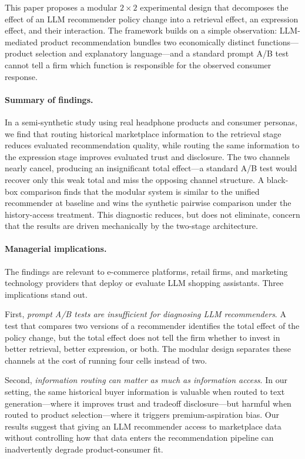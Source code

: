 \documentclass[11pt]{article}
\begin{document}
This paper proposes a modular $2 \times 2$ experimental design that decomposes the effect of an LLM recommender policy change into a retrieval effect, an expression effect, and their interaction. The framework builds on a simple observation: LLM-mediated product recommendation bundles two economically distinct functions---product selection and explanatory language---and a standard prompt A/B test cannot tell a firm which function is responsible for the observed consumer response.

\paragraph{Summary of findings.}
In a semi-synthetic study using real headphone products and consumer personas, we find that routing historical marketplace information to the retrieval stage reduces evaluated recommendation quality, while routing the same information to the expression stage improves evaluated trust and disclosure. The two channels nearly cancel, producing an insignificant total effect---a standard A/B test would recover only this weak total and miss the opposing channel structure. A black-box comparison finds that the modular system is similar to the unified recommender at baseline and wins the synthetic pairwise comparison under the history-access treatment. This diagnostic reduces, but does not eliminate, concern that the results are driven mechanically by the two-stage architecture.

\paragraph{Managerial implications.}
The findings are relevant to e-commerce platforms, retail firms, and marketing technology providers that deploy or evaluate LLM shopping assistants. Three implications stand out.

First, \emph{prompt A/B tests are insufficient for diagnosing LLM recommenders}. A test that compares two versions of a recommender identifies the total effect of the policy change, but the total effect does not tell the firm whether to invest in better retrieval, better expression, or both. The modular design separates these channels at the cost of running four cells instead of two.

Second, \emph{information routing can matter as much as information access}. In our setting, the same historical buyer information is valuable when routed to text generation---where it improves trust and tradeoff disclosure---but harmful when routed to product selection---where it triggers premium-aspiration bias. Our results suggest that giving an LLM recommender access to marketplace data without controlling how that data enters the recommendation pipeline can inadvertently degrade product-consumer fit.
\end{document}
